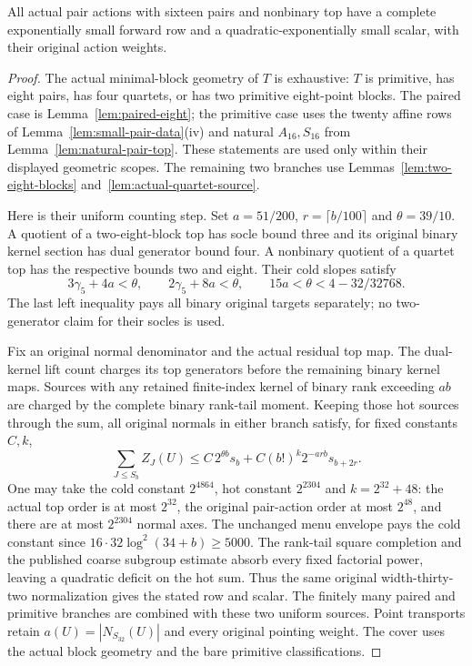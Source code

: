 \begin{theorem}\label{thm:sixteen-pairs}
All actual pair actions with sixteen pairs and nonbinary top have a
complete exponentially small forward row and a quadratic-exponentially
small scalar, with their original action weights.
\end{theorem}
\begin{proof}
The actual minimal-block geometry of $T$ is exhaustive: $T$ is primitive,
has eight pairs, has four quartets, or has two primitive eight-point
blocks. The paired case is Lemma~\ref{lem:paired-eight}; the primitive
case uses the twenty affine rows of Lemma~\ref{lem:small-pair-data}(iv)
and natural $A_{16},S_{16}$ from Lemma~\ref{lem:natural-pair-top}.
These statements are used only within their displayed geometric scopes.
The remaining two branches use Lemmas~\ref{lem:two-eight-blocks}
and~\ref{lem:actual-quartet-source}.

Here is their uniform counting step. Set $a=51/200$, $r=\lceil b/100\rceil$
and $\theta=39/10$. A quotient of a two-eight-block top has socle bound
three and its original binary kernel section has dual generator bound
four. A nonbinary quotient of a quartet top has the respective bounds
two and eight. Their cold slopes satisfy
\[
 3\gamma_5+4a<\theta,\qquad
 2\gamma_5+8a<\theta,\qquad 15a<\theta<4-32/32768.
\]
The last left inequality pays all binary original targets separately;
no two-generator claim for their socles is used.

Fix an original normal denominator and the actual residual top map.
The dual-kernel lift count charges its top generators before the remaining
binary kernel maps. Sources with any retained finite-index kernel of
binary rank exceeding $ab$ are charged by the complete binary rank-tail
moment. Keeping those hot sources through the sum, all original normals
in either branch satisfy, for fixed constants $C,k$,
\[
 \sum_{J\leq S_b} Z_J(U)
 \leq C\,2^{\theta b}s_b+
 C(b!)^k2^{-arb}s_{b+2r}.
\]
One may take the cold constant $2^{4864}$, hot constant $2^{2304}$ and
$k=2^{32}+48$: the actual top order is at most $2^{32}$, the original
pair-action order at most $2^{48}$, and there are at most $2^{2304}$
normal axes. The unchanged menu envelope pays the cold constant since
$16\cdot32\log^2(34+b)\geq5000$. The rank-tail square completion and
the published coarse subgroup estimate absorb every fixed factorial
power, leaving a quadratic deficit on the hot sum. Thus the same original
width-thirty-two normalization gives the stated row and scalar.
The finitely many paired and primitive branches are combined with these
two uniform sources. Point transports retain
$a(U)=|N_{S_{32}}(U)|$ and every original pointing weight. The cover uses
the actual block geometry and the bare primitive classifications.
\end{proof}
